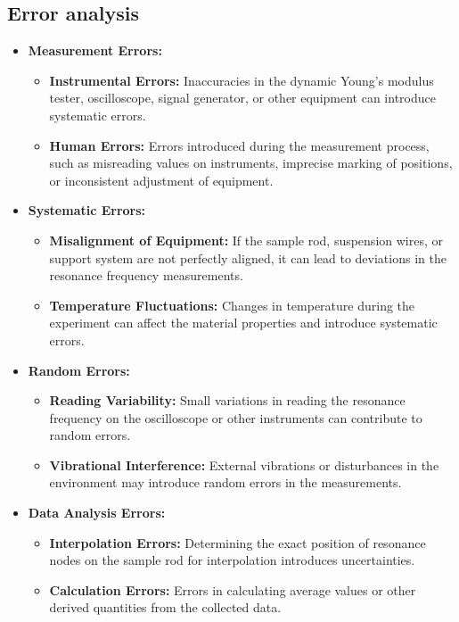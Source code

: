 \documentclass[UTF8]{article}
\begin{document}
\subsection{Error analysis}
\begin{itemize}

    \item \textbf{Measurement Errors:}
    \begin{itemize}
        \item \textbf{Instrumental Errors:} Inaccuracies in the dynamic Young's modulus tester, oscilloscope, signal generator, or other equipment can introduce systematic errors.
        \item \textbf{Human Errors:} Errors introduced during the measurement process, such as misreading values on instruments, imprecise marking of positions, or inconsistent adjustment of equipment.
    \end{itemize}

    \item \textbf{Systematic Errors:}
    \begin{itemize}
        \item \textbf{Misalignment of Equipment:} If the sample rod, suspension wires, or support system are not perfectly aligned, it can lead to deviations in the resonance frequency measurements.
        \item \textbf{Temperature Fluctuations:} Changes in temperature during the experiment can affect the material properties and introduce systematic errors.
    \end{itemize}

    \item \textbf{Random Errors:}
    \begin{itemize}
        \item \textbf{Reading Variability:} Small variations in reading the resonance frequency on the oscilloscope or other instruments can contribute to random errors.
        \item \textbf{Vibrational Interference:} External vibrations or disturbances in the environment may introduce random errors in the measurements.
    \end{itemize}

    \item \textbf{Data Analysis Errors:}
    \begin{itemize}
        \item \textbf{Interpolation Errors:} Determining the exact position of resonance nodes on the sample rod for interpolation introduces uncertainties.
        \item \textbf{Calculation Errors:} Errors in calculating average values or other derived quantities from the collected data.
    \end{itemize}


\end{itemize}
\end{document}

